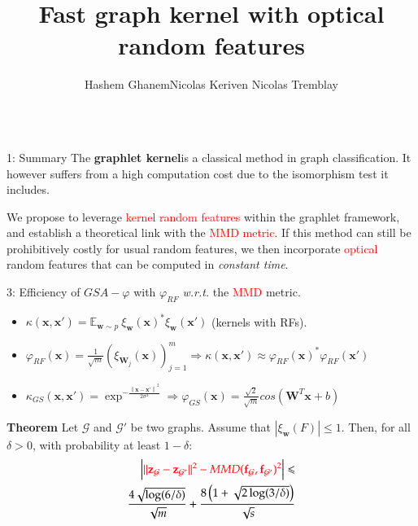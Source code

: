 \documentclass[final,dvipsnames]{beamer}
\title{Fast graph kernel with optical random features}
\author{ \qquad Hashem Ghanem\qquad Nicolas Keriven \qquad Nicolas Tremblay}
\institute{GIPSA-lab, CNRS, UGA, Grenoble INP, France
}
\newcommand{\vsp}{\vspace{10pt}}
\newcommand{\myemph}[1]{\textcolor{red}{#1}}
\newcommand{\mycolbacksum}[1]{
\hspace*{.01\linewidth}\begin{minipage}{.96\linewidth}
\begin{mdframed}[backgroundcolor=blue!10,linewidth=0pt]
\vsp
#1
\end{mdframed}
\end{minipage}
}
\newcommand{\mycolback}[1]{
\hspace*{.01\linewidth}\begin{minipage}{.96\linewidth}
\begin{mdframed}[backgroundcolor=blue!10,linewidth=0pt]
\vsp
#1
\vsp
\end{mdframed}
\end{minipage}
}
\begin{document}
\begin{frame}{}
\vspace{-40pt}
\begin{columns}[t]
\begin{column}{0.25\linewidth}
\begin{myalertblock}{1: Summary}
	The \textbf{graphlet kernel}is a classical method in graph classification. It however suffers from a high computation cost due to the isomorphism test it includes.  
\begin{center}	
\mycolbacksum{We propose to leverage \myemph{kernel random features} within the graphlet framework, and establish a theoretical link with the \myemph{MMD metric}. If this method can still be prohibitively costly for usual random features, we then incorporate \myemph{optical} random features that can be computed in \emph{constant time}.}
\end{center}

\end{myalertblock}
\vsp 


\begin{myalertblock}{3: Efficiency of $GSA-\varphi$ with  $\varphi_{RF}$ \emph{w.r.t.} the \myemph{MMD} metric.}
\vspace{0.3cm}
\small 
\begin{itemize}
	\item $\kappa(\mathbf{x},\mathbf{x}')= \mathbb{E}_{\mathbf{w} \sim p}~ \xi_\mathbf{w}(\mathbf{x})^* \xi_\mathbf{w}(\mathbf{x}')$ (kernels with RFs).
	\vsp
	\item $\varphi_{RF}(\mathbf{x}) = \frac{1}{\sqrt{m}} ( \xi_{\mathbf{W}_j}(\mathbf{x}) )_{j=1}^m \Rightarrow\kappa(\mathbf{x},\mathbf{x}')\approx \varphi_{RF}(\mathbf{x})^*\varphi_{RF}(\mathbf{x}')$
	\vsp 
	\item  $\kappa_{GS}(\mathbf{x},\mathbf{x}')=\exp^{-\frac{\left \| \mathbf{x}-\mathbf{x}'\right\|^2}{2\sigma^2}} \Rightarrow \varphi_{GS}(\mathbf{x}) = \frac{\sqrt{2}}{\sqrt{m}} cos( \mathbf{W}^T\mathbf{x}+b )$

\end{itemize}
\vsp
\mycolback{
\textbf{Theorem}
Let $\mathcal{G}$ and $\mathcal{G}'$ be two graphs.  Assume that $|\xi_\mathbf{w}(F)| \leq 1$.
Then, for all $\delta>0$, with probability at least $1-\delta$:
\begin{align*}
	\Big|\textcolor{red}{\|\mathbf{z}_\mathcal{G} - \mathbf{z}_{\mathcal{G}'}\|^2 - MMD(\mathbf{f}_\mathcal{G},\mathbf{f}_{\mathcal{G}'})^2} \Big| \leq \\\frac{4 \sqrt{\log (6/\delta)}}{\sqrt{m}} + \frac{8\left(1+\sqrt{2\log(3/\delta)}\right)}{\sqrt{{s}}}
\end{align*}
}
\vspace{1cm}
\end{myalertblock}


\end{column}
\end{columns}
\end{frame}
\end{document}
